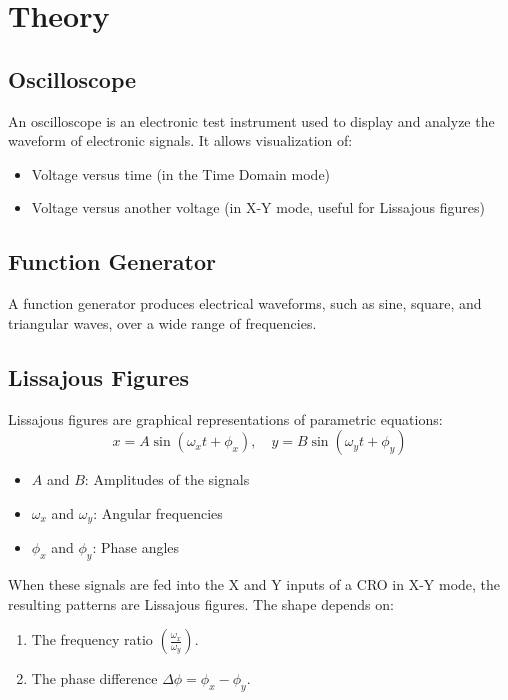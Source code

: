 \documentclass[a4paper,12pt]{article}
\begin{document}
\section*{\color{myblue}Theory}

\subsection*{\color{mygreen}Oscilloscope}
An oscilloscope is an electronic test instrument used to display and analyze the waveform of electronic signals. It allows visualization of:
\begin{itemize}
    \item Voltage versus time (in the Time Domain mode)
    \item Voltage versus another voltage (in X-Y mode, useful for Lissajous figures)
\end{itemize}

\subsection*{\color{mygreen}Function Generator}
A function generator produces electrical waveforms, such as sine, square, and triangular waves, over a wide range of frequencies.

\subsection*{\color{mygreen}Lissajous Figures}
Lissajous figures are graphical representations of parametric equations:
\[
x = A \sin(\omega_x t + \phi_x), \quad y = B \sin(\omega_y t + \phi_y)
\]
\begin{itemize}
    \item $A$ and $B$: Amplitudes of the signals
    \item $\omega_x$ and $\omega_y$: Angular frequencies
    \item $\phi_x$ and $\phi_y$: Phase angles
\end{itemize}

When these signals are fed into the X and Y inputs of a CRO in X-Y mode, the resulting patterns are Lissajous figures. The shape depends on:
\begin{enumerate}
    \item The frequency ratio $\left(\frac{\omega_x}{\omega_y}\right)$.
    \item The phase difference $\Delta\phi = \phi_x - \phi_y$.
\end{enumerate}
\end{document}
